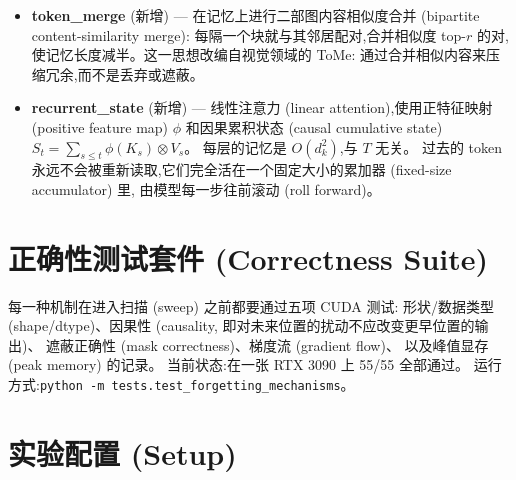 \documentclass[10pt,UTF8]{ctexart}
\begin{document}
\begin{itemize}
模型实际用过的块会被保留下来。
保留是一个自组织 (self-organizing) 的过程 ---
训练期间的使用情况决定了哪些会留在记忆里。
\item \textbf{token\_merge} (新增) ---
在记忆上进行二部图内容相似度合并 (bipartite content-similarity merge):
每隔一个块就与其邻居配对,合并相似度 top-$r$ 的对,
使记忆长度减半。这一思想改编自视觉领域的 ToMe:
通过合并相似内容来压缩冗余,而不是丢弃或遮蔽。
\item \textbf{recurrent\_state} (新增) ---
线性注意力 (linear attention),使用正特征映射 (positive feature map) $\phi$
和因果累积状态 (causal cumulative state)
$S_t = \sum_{s\leq t} \phi(K_s)\otimes V_s$。
每层的记忆是 $O(d_k^2)$,与 $T$ 无关。
过去的 token 永远不会被重新读取,它们完全活在一个固定大小的累加器 (fixed-size accumulator) 里,
由模型每一步往前滚动 (roll forward)。
\end{itemize}

\section{正确性测试套件 (Correctness Suite)}

每一种机制在进入扫描 (sweep) 之前都要通过五项 CUDA 测试:
形状/数据类型 (shape/dtype)、因果性 (causality,
即对未来位置的扰动不应改变更早位置的输出)、
遮蔽正确性 (mask correctness)、梯度流 (gradient flow)、
以及峰值显存 (peak memory) 的记录。
当前状态:在一张 RTX 3090 上 55/55 全部通过。
运行方式:\verb|python -m tests.test_forgetting_mechanisms|。

\section{实验配置 (Setup)}
\end{document}

